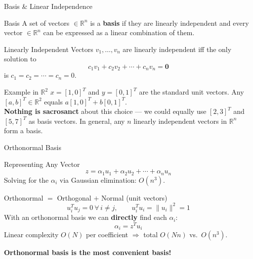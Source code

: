 \documentclass{beamer}
\begin{document}
\begin{frame}[shrink=10]{Basis \& Linear Independence}
  \begin{block}{Basis}
    A set of vectors $\in\mathbb{R}^n$ is a \textbf{basis} if they are
    linearly independent and every vector $\in\mathbb{R}^n$ can be
    expressed as a linear combination of them.
  \end{block}

  \medskip

  \begin{block}{Linearly Independent Vectors}
    $v_1,\ldots,v_n$ are linearly independent iff the only solution to
    \[
      c_1 v_1 + c_2 v_2 + \cdots + c_n v_n = \mathbf{0}
    \]
    is $c_1 = c_2 = \cdots = c_n = 0$.
  \end{block}

  \medskip

  \begin{exampleblock}{Example in $\mathbb{R}^2$}
    $x=[1,0]^T$ and $y=[0,1]^T$ are the standard unit vectors.
    Any $[a,b]^T \in \mathbb{R}^2$ equals $a[1,0]^T + b[0,1]^T$.\\[4pt]
    \textbf{Nothing is sacrosanct} about this choice --- we could
    equally use $[2,3]^T$ and $[5,7]^T$ as basis vectors.
    In general, any $n$ linearly independent vectors in $\mathbb{R}^n$
    form a basis.
  \end{exampleblock}
\end{frame}

\begin{frame}[shrink=10]{Orthonormal Basis}
  \begin{block}{Representing Any Vector}
    \[
      z = \alpha_1 u_1 + \alpha_2 u_2 + \cdots + \alpha_n u_n
    \]
    Solving for the $\alpha_i$ via Gaussian elimination:
    $O(n^3)$.
  \end{block}

  \medskip

  \begin{block}{Orthonormal $=$ Orthogonal $+$ Normal (unit vectors)}
    \[
      u_i^T u_j = 0\ \forall\,i\neq j,
      \qquad
      u_i^T u_i = \|u_i\|^2 = 1
    \]
    With an orthonormal basis we can \textbf{directly} find each
    $\alpha_i$:
    \[
      \alpha_i = z^T u_i
    \]
    Linear complexity $O(N)$ per coefficient
    $\Rightarrow$ total $O(Nn)$ vs.\ $O(n^3)$.

    \medskip

    \textbf{Orthonormal basis is the most convenient basis!}
  \end{block}
\end{frame}
\end{document}

